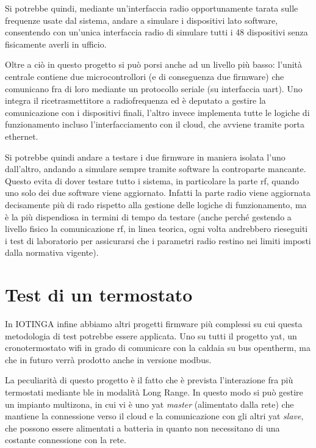 \documentclass[12pt,a4paper,twoside,titlepage]{book}
\begin{document}
Si potrebbe quindi, mediante un'interfaccia radio opportunamente tarata sulle frequenze usate
dal sistema, andare a simulare i dispositivi lato software, consentendo con un'unica interfaccia
radio di simulare tutti i 48 dispositivi senza fisicamente averli in ufficio.

Oltre a ciò in questo progetto si può porsi anche ad un livello più basso: l'unità
centrale contiene due microcontrollori (e di conseguenza due \gls{firmware}) che comunicano fra di
loro mediante un protocollo seriale (su interfaccia \acrshort{uart}). Uno integra il ricetrasmettitore
a radiofrequenza ed è deputato a gestire la comunicazione con i dispositivi
finali, l'altro invece implementa tutte le logiche di funzionamento incluso l'interfacciamento
con il cloud, che avviene tramite porta ethernet.

Si potrebbe quindi andare a testare i due \gls{firmware} in maniera isolata l'uno dall'altro,
andando a simulare sempre tramite software la controparte mancante. Questo evita di dover
testare tutto i sistema, in particolare la parte \Gls{rf}, quando uno solo dei due software viene
aggiornato. Infatti la parte radio viene aggiornata decisamente più di rado rispetto alla
gestione delle logiche di funzionamento, ma è la più dispendiosa in termini di tempo da testare
(anche perché gestendo a livello fisico la comunicazione \Gls{rf}, in linea teorica, ogni volta andrebbero
rieseguiti i test di laboratorio per assicurarsi che i parametri radio restino nei limiti
imposti dalla normativa vigente).

\section{Test di un termostato}

In IOTINGA infine abbiamo altri progetti \gls{firmware} più complessi su cui questa metodologia
di test potrebbe essere applicata. Uno su tutti il progetto \acrfull{yat},
un cronotermostato \Gls{wifi} in grado di comunicare con la caldaia su bus \Gls{opentherm}, ma
che in futuro verrà prodotto anche in versione \Gls{modbus}.

La peculiarità di questo progetto è il fatto che è prevista l'interazione fra più
termostati mediante \Gls{ble} in modalità Long Range. In questo modo
si può gestire un impianto multizona, in cui vi è uno \acrshort{yat} \textit{master} (alimentato
dalla rete) che mantiene la connessione verso il \gls{cloud} e la comunicazione
con gli altri \acrshort{yat} \textit{slave}, che possono essere alimentati a batteria
in quanto non necessitano di una costante connessione con la rete.
\end{document}
